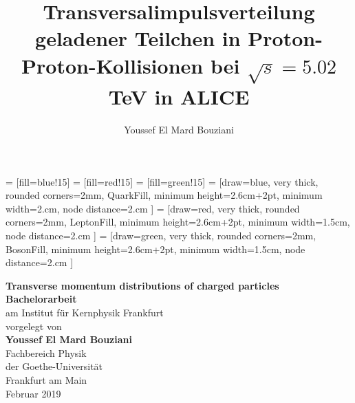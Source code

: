 \documentclass[12pt,a4paper]{report}
\author{Youssef El Mard Bouziani}
\title{Transversalimpulsverteilung geladener Teilchen in Proton-Proton-Kollisionen bei  $\sqrt{s} = 5.02$ TeV in ALICE}
\begin{document}
\newcommand{\Quark}[5]
{
  \begin{minipage}{0.cm}
      {\hfill \footnotesize \text{ #3} }
  \end{minipage}
 {\raisebox{40pt}{\makebox[1em][l]{\footnotesize \textbf{#1}}}%
 \hspace{2.3cm} \raisebox{40pt}{\makebox[3em][l]{\footnotesize \textbf{#2} }} \hspace{-3.1cm} 
       \parbox[t][1em]{3em}{\centering{\fontsize{40}{40}\selectfont  #4}	}\hspace*{1em} 
    \parbox[c][6em]{0em}{\vspace{1.4cm}\hspace{-2.7cm}\centering \footnotesize \textbf{#5}}   
}
}
   = [fill=blue!15]
   = [fill=red!15]
   = [fill=green!15]
   = [draw=blue, very thick, rounded corners=2mm, QuarkFill,  minimum height={2.6cm+2pt}, minimum width=2.cm, node distance=2.cm ]
     = [draw=red, very thick, rounded corners=2mm, LeptonFill,  minimum height={2.6cm+2pt}, minimum width=1.5cm, node distance=2.cm ]
     = [draw=green, very thick, rounded corners=2mm, BosonFill,  minimum height={2.6cm+2pt}, minimum width=1.5cm, node distance=2.cm ]
   
\newcommand{\pt}{$p_\text{T}$ }
    


\begin{titlepage}
\begin{center}

\vspace*{4cm}  

\huge{\textbf{Transverse momentum distributions of charged particles}}\\[2cm]
\vfill
\Large{\textbf{Bachelorarbeit}}\\
am Institut für Kernphysik Frankfurt\\
\vfill
vorgelegt von\\[1cm]
\Large{\textbf{Youssef El Mard Bouziani}}\\[1cm]
\vfill
Fachbereich Physik\\
der Goethe-Universität\\
Frankfurt am Main\\
\vspace*{1cm}
Februar 2019
\end{center}
\end{titlepage}
\end{document}
